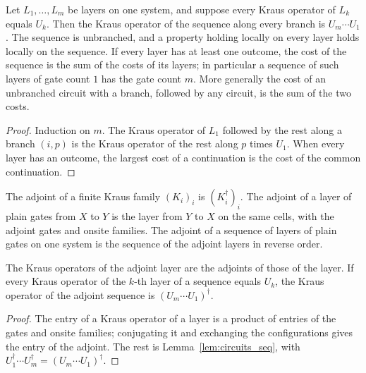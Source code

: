\begin{lemma}
    \label{lem:circuits_seq}
    \leanok
    Let $L_1,\dots,L_m$ be layers on one system, and suppose every Kraus operator of
    $L_k$ equals $U_k$. Then the Kraus operator of the sequence along every branch is
    $U_m\cdots U_1$. The sequence is unbranched, and a property holding locally on
    every layer holds locally on the sequence. If every layer has at least one
    outcome, the cost of the sequence is the sum of the costs of its layers; in
    particular a sequence of such layers of gate count $1$ has the gate count $m$.
    More generally the cost of an unbranched circuit with a branch, followed by any
    circuit, is the sum of the two costs.
\end{lemma}
\begin{proof}\leanok
    Induction on $m$. The Kraus operator of $L_1$ followed by the rest along a
    branch $(i,p)$ is the Kraus operator of the rest along $p$ times $U_1$. When
    every layer has an outcome, the largest cost of a continuation is the cost of
    the common continuation.
\end{proof}

\begin{definition}
    \label{def:circuits_adjoint}
    \leanok
    The adjoint of a finite Kraus family $(K_i)_i$ is $(K_i^\dagger)_i$. The adjoint
    of a layer of plain gates from $X$ to $Y$ is the layer from $Y$ to $X$ on the
    same cells, with the adjoint gates and onsite families. The adjoint of a sequence
    of layers of plain gates on one system is the sequence of the adjoint layers in
    reverse order.
\end{definition}

\begin{lemma}
    \label{lem:circuits_adjoint}
    \leanok
    The Kraus operators of the adjoint layer are the adjoints of those of the layer.
    If every Kraus operator of the $k$-th layer of a sequence equals $U_k$, the Kraus
    operator of the adjoint sequence is $(U_m\cdots U_1)^\dagger$.
\end{lemma}
\begin{proof}\leanok
    The entry of a Kraus operator of a layer is a product of entries of the gates and
    onsite families; conjugating it and exchanging the configurations gives the
    entry of the adjoint. The rest is Lemma~\ref{lem:circuits_seq}, with
    $U_1^\dagger\cdots U_m^\dagger=(U_m\cdots U_1)^\dagger$.
\end{proof}

